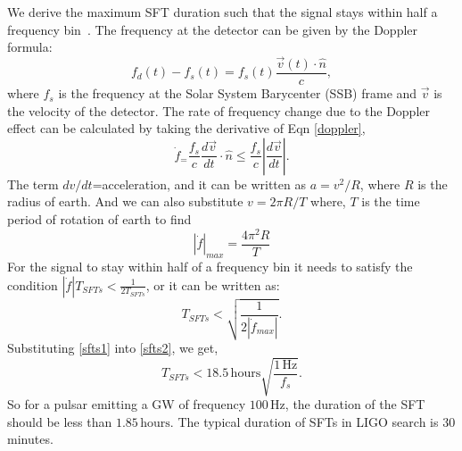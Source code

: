 \documentclass{ttuthes2007}
\begin{document}
We derive the maximum \ac{SFT} duration such that the signal stays within half
a frequency bin~\cite{Krishnan_2004}. The frequency at the detector can be given by the Doppler formula:
\begin{equation}
\label{doppler}
f_d(t) - f_s(t) = f_s(t)\frac{\vec{v}(t)\cdot\hat{n}}{c},
\end{equation}
where $f_s$ is the frequency at the Solar System Barycenter (SSB) frame and
$\vec{v}$ is the velocity of the detector.
The rate of frequency change due to the Doppler effect can be calculated by
taking the derivative of Eqn \ref{doppler},
\begin{equation}
\dot{f}_= \frac{f_s}{c}\frac{d\vec{v}}{dt}\cdot\hat{n} \leq
\frac{f_s}{c}\left|\frac{d\vec{v}}{dt}\right|.
\end{equation}
The term $dv/dt$=acceleration, and it can be written as $a=v^2/R$, where $R$ is
the radius of earth. And we can also substitute $v=2\pi R/T$ where, $T$ is the time
period of rotation of earth to find
\begin{equation}\label{sfts1}
|\dot{f}|_{max}= \frac{4\pi^2R}{T}
\end{equation}
For the signal to stay within half of a frequency bin it needs to satisfy
the condition $|\dot{f}|T_{SFTs} < \frac{1}{2T_{SFTs}}$, or it can be written as:
\begin{equation}\label{sfts2}
T_{SFTs}<\sqrt{\frac{1}{2|\dot{f}_{max}|}}.
\end{equation}
Substituting \ref{sfts1} into \ref{sfts2}, we get,
\begin{equation}
T_{SFTs} < 18.5\,\mathrm{hours} \sqrt{\frac{1\,\mathrm{Hz}}{f_s}}.
\end{equation}
So for a pulsar emitting a \ac{GW} of frequency $100\,\mathrm{Hz}$, the duration of the
\ac{SFT} should be less than $1.85\,\mathrm{hours}$. The typical duration of \acp{SFT} in
\ac{LIGO} search is 30 minutes.
\end{document}
